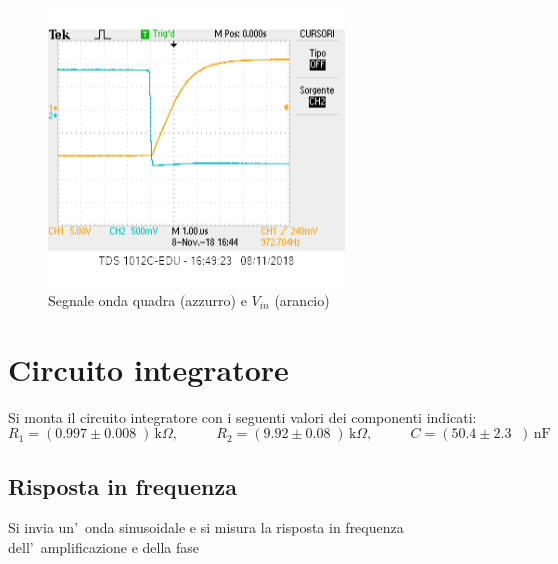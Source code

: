 \documentclass[10pt,a4paper]{article}
\newcommand{\exn}{\phantom{xxx}}
\begin{document}
\begin{figure}[h]
		\begin{center}
			
			\includegraphics[width=0.7\textwidth]{slewrate}
			\caption{\small Segnale onda quadra (azzurro) e $V_{in}$ (arancio)}
			\label{fig:Slew  Rate}
		\end{center}
	\end{figure}

	\section{Circuito integratore}
	Si monta il circuito integratore con i seguenti valori  dei componenti indicati: 
	\[
	R_1 = (0.997 \pm 0.008 \;) \,\mathrm{k}\Omega, \:\:\;\:\exn 
	R_2 = (9.92 \pm 0.08 \;) \,\mathrm{k}\Omega, \:\:\;\:\exn 
	C = (50.4 \pm 2.3 \;\;)\,\mathrm{nF}
	\]
	
	\subsection{Risposta in frequenza}
	
	Si invia un'~onda sinusoidale e si misura la risposta in frequenza dell'~amplificazione e della fase
	
\end{document}
